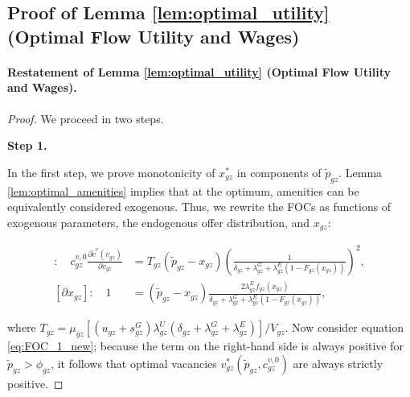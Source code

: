 \subsection{Proof of Lemma \ref{lem:optimal_utility} (Optimal Flow Utility and Wages)\label{app:proof_lemma_optimal_utility}}

\paragraph{Restatement of Lemma \ref{lem:optimal_utility} (Optimal Flow Utility and Wages).}

\emph{%
    \OptimalFlowPayoffs%
}

\begin{proof}

    We proceed in two steps.


    \textbf{Step 1.}

    In the first step, we prove monotonicity of $x_{gz}^{*}$ in components of $\tilde{p}_{gz}$. Lemma \ref{lem:optimal_amenities} implies that at the optimum, amenities can be equivalently considered exogenous. Thus, we rewrite the FOCs as functions of exogenous parameters, the endogenous offer distribution, and $x_{gz}$:
    \begin{small}
            \begin{align}
            [\partial v_{gz}]: \quad c_{gz}^{v,0} \frac{\partial \tilde{c}^{v}(v_{gz})}{\partial v_{gz}} &= T_{gz} (\tilde{p}_{gz} - x_{gz}) \left( \frac{1}{\delta_{gz} + \lambda_{gz}^{G} + \lambda_{gz}^{E} (1 - F_{gz}(x_{gz}))} \right)^2, \label{eq:FOC_1_new} \\
            [\partial x_{gz}]: \quad 1 &= (\tilde{p}_{gz} - x_{gz}) \frac{2 \lambda_{gz}^{E} f_{gz} (x_{gz} )}{\delta_{gz} + \lambda_{gz}^{G} + \lambda_{gz}^{E} (1 - F_{gz}(x_{gz}))}, \label{eq:FOC_3_new}
        \end{align}
    \end{small}
    where $T_{gz} = \mu_{gz} [(u_{gz} + s_{gz}^{G}) \lambda_{gz}^{U} (\delta_{gz} + \lambda_{gz}^{G} + \lambda_{gz}^{E})] / V_{gz}$. Now consider equation \eqref{eq:FOC_1_new}; because the term on the right-hand side is always positive for $\tilde{p}_{gz} > \phi_{gz}$, it follows that optimal vacancies $v_{gz}^{*}(\tilde{p}_{gz},c_{gz}^{v,0})$ are always strictly positive.


\end{proof}
